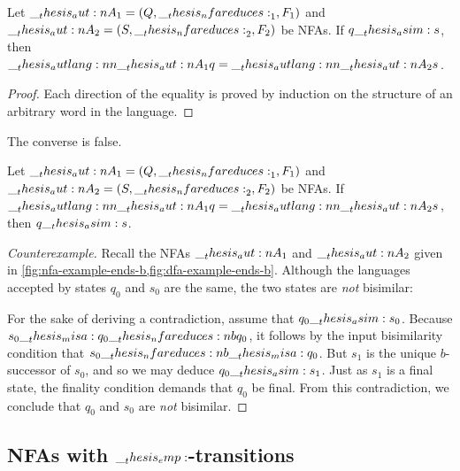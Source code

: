 \begin{theorem}
  Let $\aut{A}_1 = (Q, \mathord{\nfareduces}_1, F_1)$ and $\aut{A}_2 = (S, \mathord{\nfareduces}_2, F_2)$ be \acp{NFA}.
  If $q \__thesis_asim: s$, then $\__thesis_autlang:nn {\__thesis_aut:n {A}_1} {q} = \__thesis_autlang:nn {\__thesis_aut:n {A}_2} {s}$.
\end{theorem}
%
\begin{proof}
  Each direction of the equality is proved by induction on the structure of an arbitrary word in the language.
\end{proof}

The converse is false.
%
\begin{falseclaim}
  Let $\aut{A}_1 = (Q, \mathord{\nfareduces}_1, F_1)$ and $\aut{A}_2 = (S, \mathord{\nfareduces}_2, F_2)$ be \acp{NFA}.
  If $\__thesis_autlang:nn {\__thesis_aut:n {A}_1} {q} = \__thesis_autlang:nn {\__thesis_aut:n {A}_2} {s}$, then $q \__thesis_asim: s$.
\end{falseclaim}
%
\begin{proof}[Counterexample]
  Recall the \acp{NFA} $\__thesis_aut:n {A}_1$ and $\__thesis_aut:n {A}_2$ given in \cref{fig:nfa-example-ends-b,fig:dfa-example-ends-b}.
  Although the languages accepted by states $q_0$ and $s_0$ are the same, the two states are \emph{not} bisimilar:

  For the sake of deriving a contradiction, assume that $q_0 \__thesis_asim: s_0$.
  Because $s_0 \misa q_0 \nfareduces[b] q_0$, it follows by the input bisimilarity condition that $s_0 \nfareduces[b]\misa q_0$.
  But $s_1$ is the unique $b$-successor of $s_0$, and so we may deduce $q_0 \__thesis_asim: s_1$.
  Just as $s_1$ is a final state, the finality condition demands that $q_0$ be final.
  From this contradiction, we conclude that $q_0$ and $s_0$ are \emph{not} bisimilar. 
\end{proof}


\subsection{\Aclp*{NFA} with $\__thesis_emp:$-transitions}

